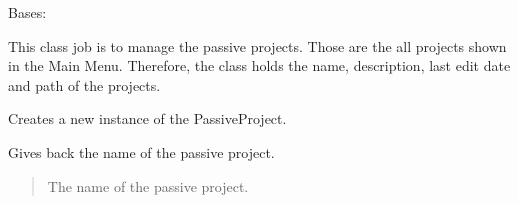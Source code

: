 \documentclass[letterpaper,10pt,english]{sphinxmanual}
\begin{document}
\begin{fulllineitems}
\label{\detokenize{apidoc/src.osm_configurator.model.application:src.osm_configurator.model.application.passive_project.PassiveProject}}
\pysigstartsignatures
{}
\pysigstopsignatures
\sphinxAtStartPar
Bases: 

\sphinxAtStartPar
This class job is to manage the passive projects. Those are the all projects shown in the Main Menu. Therefore,
the class holds the name, description, last edit date and path of the projects.

\begin{fulllineitems}
\label{\detokenize{apidoc/src.osm_configurator.model.application:src.osm_configurator.model.application.passive_project.PassiveProject.__init__}}
\pysigstartsignatures
{}
\pysigstopsignatures
\sphinxAtStartPar
Creates a new instance of the PassiveProject.

\end{fulllineitems}


\begin{fulllineitems}
\label{\detokenize{apidoc/src.osm_configurator.model.application:src.osm_configurator.model.application.passive_project.PassiveProject.get_name}}
\pysigstartsignatures
{}
\pysigstopsignatures
\sphinxAtStartPar
Gives back the name of the passive project.
\begin{quote}\begin{description}
\sphinxAtStartPar
The name of the passive project.

\sphinxAtStartPar
{}

\end{description}\end{quote}

\end{fulllineitems}


\end{fulllineitems}
\end{document}
